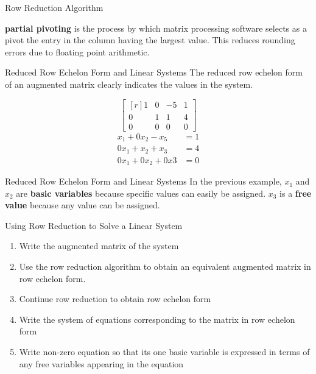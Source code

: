 \documentclass{beamer}
\begin{document}
\begin{frame}{Row Reduction Algorithm}
  \begin{definition}
    \textbf{partial pivoting} is the process by which matrix processing software selects as
    a pivot the entry in the column having the largest value. This reduces rounding errors
    due to floating point arithmetic.
  \end{definition}
\end{frame}

\begin{frame}{Reduced Row Echelon Form and Linear Systems}
  The reduced row echelon form of an augmented matrix clearly indicates the values in
  the system.
  \begin{example}
    \[
    \begin{bmatrix*}[r]
      1 & 0 & -5 & 1 \\
      0 & 1 & 1  & 4 \\
      0 & 0 & 0  & 0
    \end{bmatrix*}
    \]
    \begin{equation}
      \begin{split}
        x_{1}  + 0x_{2} - x_{5} &= 1 \\
        0x_{1} + x_{2}  + x_{3} &= 4 \\
        0x_{1} + 0x_{2} + 0x{3} &= 0 
      \end{split}
    \end{equation}
  \end{example}
\end{frame}

\begin{frame}{Reduced Row Echelon Form and Linear Systems}
  In the previous example, $x_{1}$ and $x_{2}$ are \textbf{basic variables} because specific
  values can easily be assigned. $x_{3}$ is a \textbf{free value} because any value can be assigned.
\end{frame}

\begin{frame}{Using Row Reduction to Solve a Linear System}
  \begin{enumerate}
    \item Write the augmented matrix of the system
    \item Use the row reduction algorithm to obtain an equivalent augmented matrix in row echelon form.
    \item Continue row reduction to obtain row echelon form
    \item Write the system of equations corresponding to the matrix in row echelon form 
    \item Write non-zero equation so that its one basic variable is expressed in terms of any free variables appearing in the equation
  \end{enumerate}
\end{frame}
\end{document}
